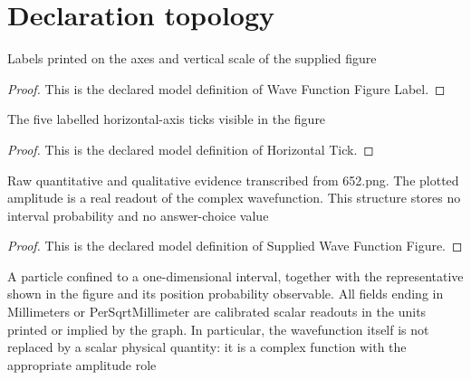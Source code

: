 \section{Declaration topology}
\begin{definition}
  \label{def:physics:phyx-mini-0652:phyxminiproblems-problemphyxmini0652-wavefunctionfigurelabel}
  Labels printed on the axes and vertical scale of the supplied figure
\end{definition}
\begin{proof}
  This is the declared model definition of Wave Function Figure Label.
\end{proof}
\begin{definition}
  \label{def:physics:phyx-mini-0652:phyxminiproblems-problemphyxmini0652-horizontaltick}
  The five labelled horizontal-axis ticks visible in the figure
\end{definition}
\begin{proof}
  This is the declared model definition of Horizontal Tick.
\end{proof}
\begin{definition}
  \label{def:physics:phyx-mini-0652:phyxminiproblems-problemphyxmini0652-suppliedwavefunctionfigure}
  Raw quantitative and qualitative evidence transcribed from 652.png. The plotted amplitude is a real readout of the complex wavefunction. This structure stores no interval probability and no answer-choice value
\end{definition}
\begin{proof}
  This is the declared model definition of Supplied Wave Function Figure.
\end{proof}
\begin{definition}
  \label{def:physics:phyx-mini-0652:phyxminiproblems-problemphyxmini0652-confinedparticlepositionsetup}
  A particle confined to a one-dimensional interval, together with the representative shown in the figure and its position probability observable. All fields ending in Millimeters or PerSqrtMillimeter are calibrated scalar readouts in the units printed or implied by the graph. In particular, the wavefunction itself is not replaced by a scalar physical quantity: it is a complex function with the appropriate amplitude role
\end{definition}
